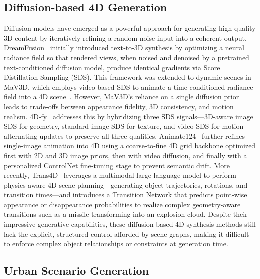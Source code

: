 \documentclass{article}
\begin{document}
\subsection{Diffusion-based 4D Generation}

Diffusion models have emerged as a powerful approach for generating high‐quality 3D content by iteratively refining a random noise input into a coherent output. DreamFusion~\cite{poole2022dreamfusion} initially introduced text‐to‐3D synthesis by optimizing a neural radiance field so that rendered views, when noised and denoised by a pretrained text‐conditioned diffusion model, produce identical gradients via Score Distillation Sampling (SDS). This framework was extended to dynamic scenes in MaV3D, which employs video‐based SDS to animate a time‐conditioned radiance field into a 4D scene~\cite{singer2023text}. However, MaV3D’s reliance on a single diffusion prior leads to trade‐offs between appearance fidelity, 3D consistency, and motion realism. 4D‐fy~\cite{bahmani20244d} addresses this by hybridizing three SDS signals—3D‐aware image SDS for geometry, standard image SDS for texture, and video SDS for motion—alternating updates to preserve all three qualities. Animate124~\cite{zhao2023animate124} further refines single‐image animation into 4D using a coarse‐to‐fine 4D grid backbone optimized first with 2D and 3D image priors, then with video diffusion, and finally with a personalized ControlNet fine‐tuning stage to prevent semantic drift. More recently, Trans4D~\cite{zeng2024trans4d} leverages a multimodal large language model to perform physics‐aware 4D scene planning—generating object trajectories, rotations, and transition times—and introduces a Transition Network that predicts point‐wise appearance or disappearance probabilities to realize complex geometry‐aware transitions such as a missile transforming into an explosion cloud. Despite their impressive generative capabilities, these diffusion-based 4D synthesis methods still lack the explicit, structured control afforded by scene graphs, making it difficult to enforce complex object relationships or constraints at generation time.

\subsection{Urban Scenario Generation}
\end{document}

